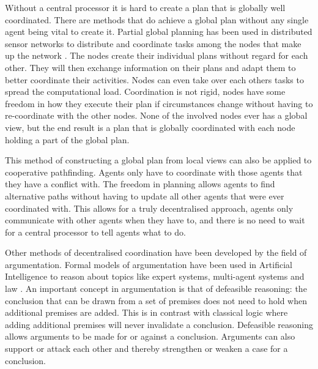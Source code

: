 Without a central processor it is hard to create a plan that is globally well
coordinated. There are methods that do achieve a global plan without any single
agent being vital to create it.
Partial global planning has been used in distributed sensor networks to
distribute and coordinate tasks among the nodes that make up the network
\cite{durfee1991}. The nodes create their individual plans without regard for
each other. They will then exchange information on their plans and adapt them
to better coordinate their activities. Nodes can even take over each others
tasks to spread the computational load. Coordination is not rigid, nodes have
some freedom in how they execute their plan if circumstances change without
having to re-coordinate with the other nodes. None of the involved nodes ever
has a global view, but the end result is a plan that is globally coordinated
with each node holding a part of the global plan.

This method of constructing a global plan from local views can also be applied
to cooperative pathfinding. Agents only have to coordinate with those agents
that they have a conflict with. The freedom in planning allows agents to find
alternative paths without having to update all other agents that were ever
coordinated with. This allows for a truly decentralised approach,
agents only communicate with other agents when they have to, and there is no
need to wait for a central processor to tell agents what to do.

Other methods of decentralised coordination have been developed by the field of
argumentation. Formal models of argumentation have been used in Artificial
Intelligence to reason about topics like expert systems, multi-agent systems
and law \cite{vaneemeren2014}. An important concept in argumentation is that of
defeasible reasoning: the conclusion that can be drawn from a set of premises
does not need to hold when additional premises are added. This is in contrast
with classical logic where adding additional premises will never invalidate a
conclusion. Defeasible reasoning allows arguments to be made for or against a
conclusion. Arguments can also support or attack each other and thereby
strengthen or weaken a case for a conclusion.

